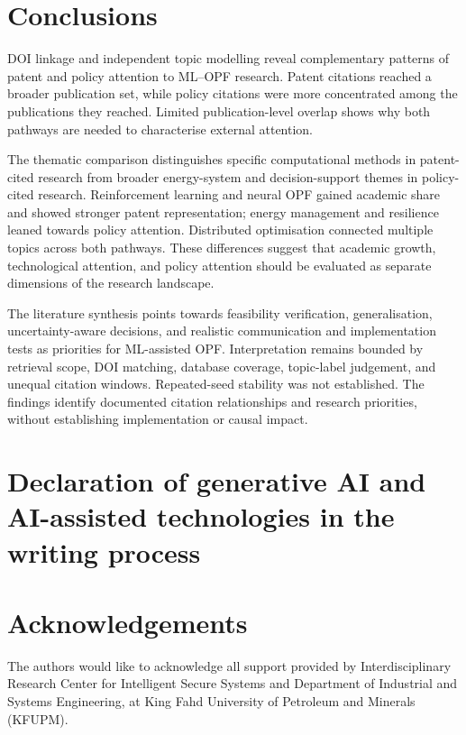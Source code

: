 \documentclass[a4paper,fleqn]{cas-sc}
\begin{document}
    \section{Conclusions}\label{sec:conclusions}
    
    DOI linkage and independent topic modelling reveal complementary patterns of patent and policy attention to ML--OPF research. Patent citations reached a broader publication set, while policy citations were more concentrated among the publications they reached. Limited publication-level overlap shows why both pathways are needed to characterise external attention.
    
    The thematic comparison distinguishes specific computational methods in patent-cited research from broader energy-system and decision-support themes in policy-cited research. Reinforcement learning and neural OPF gained academic share and showed stronger patent representation; energy management and resilience leaned towards policy attention. Distributed optimisation connected multiple topics across both pathways. These differences suggest that academic growth, technological attention, and policy attention should be evaluated as separate dimensions of the research landscape.
    
    The literature synthesis points towards feasibility verification, generalisation, uncertainty-aware decisions, and realistic communication and implementation tests as priorities for ML-assisted OPF. Interpretation remains bounded by retrieval scope, DOI matching, database coverage, topic-label judgement, and unequal citation windows. Repeated-seed stability was not established. The findings identify documented citation relationships and research priorities, without establishing implementation or causal impact.
    
    \section*{Declaration of generative AI and AI-assisted technologies in the writing process}
    
    
    \section*{Acknowledgements}
    The authors would like to acknowledge all support provided by Interdisciplinary Research Center for Intelligent Secure Systems and Department of Industrial and Systems Engineering, at King Fahd University of Petroleum and Minerals (KFUPM).
    
\end{document}
